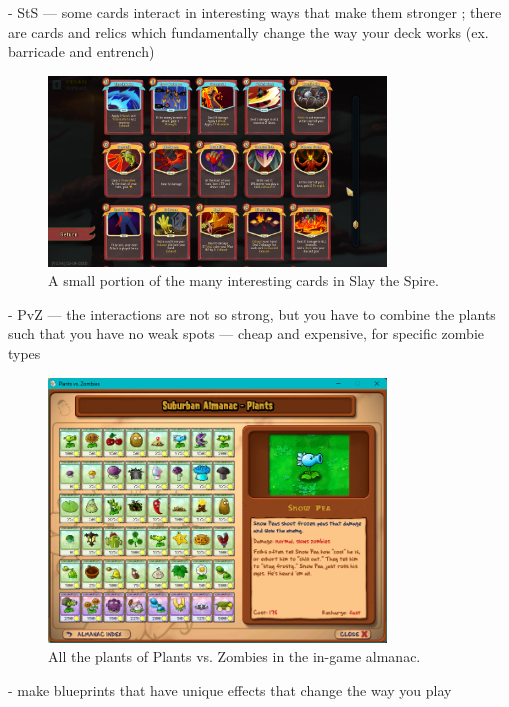 - StS --- some cards interact in interesting ways that make them stronger ; there are cards and relics which fundamentally change the way your deck works (ex. barricade and entrench)

\begin{figure}[htb]
    \centering
    \includegraphics[width=0.8\textwidth]{img/Slay-the-Spire-Compendium.png}
    \caption{A small portion of the many interesting cards in Slay the Spire.}
    \label{fig:slay-the-spire-compendium}
\end{figure}

- PvZ --- the interactions are not so strong, but you have to combine the plants such that you have no weak spots --- cheap and expensive, for specific zombie types

\begin{figure}[htb]
    \centering
    \includegraphics[width=0.8\textwidth]{img/Plants-vs-Zombies-Almanac.png}
    \caption{All the plants of Plants vs. Zombies in the in-game almanac.}
    \label{fig:plants-vs-zombies-almanac}
\end{figure}

- make blueprints that have unique effects that change the way you play


